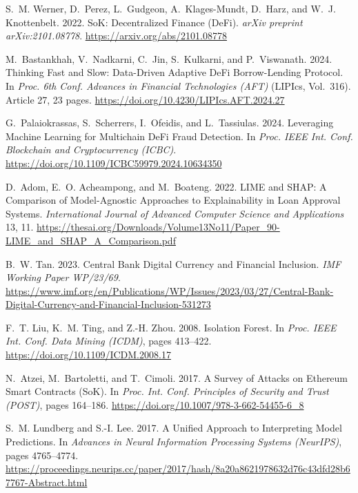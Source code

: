 \documentclass[12pt,a4paper]{report}
\begin{document}
{\small
\begin{enumerate}[label={[\arabic*]}]
\setlength{\itemsep}{4pt}
\setlength{\parsep}{0pt}
\setlength{\parskip}{0pt}
\item S.~M. Werner, D.~Perez, L.~Gudgeon, A.~Klages-Mundt, D.~Harz, and W.~J. Knottenbelt. 2022. SoK: Decentralized Finance (DeFi). \emph{arXiv preprint arXiv:2101.08778}. \url{https://arxiv.org/abs/2101.08778}

\item M.~Bastankhah, V.~Nadkarni, C.~Jin, S.~Kulkarni, and P.~Viswanath. 2024. Thinking Fast and Slow: Data-Driven Adaptive DeFi Borrow-Lending Protocol. In \emph{Proc. 6th Conf. Advances in Financial Technologies (AFT)} (LIPIcs, Vol.~316). Article 27, 23 pages. \url{https://doi.org/10.4230/LIPIcs.AFT.2024.27}

\item G.~Palaiokrassas, S.~Scherrers, I.~Ofeidis, and L.~Tassiulas. 2024. Leveraging Machine Learning for Multichain DeFi Fraud Detection. In \emph{Proc. IEEE Int. Conf. Blockchain and Cryptocurrency (ICBC)}. \url{https://doi.org/10.1109/ICBC59979.2024.10634350}

\item D.~Adom, E.~O. Acheampong, and M.~Boateng. 2022. LIME and SHAP: A Comparison of Model-Agnostic Approaches to Explainability in Loan Approval Systems. \emph{International Journal of Advanced Computer Science and Applications} 13, 11. \url{https://thesai.org/Downloads/Volume13No11/Paper_90-LIME_and_SHAP_A_Comparison.pdf}

\item B.~W. Tan. 2023. Central Bank Digital Currency and Financial Inclusion. \emph{IMF Working Paper WP/23/69}. \url{https://www.imf.org/en/Publications/WP/Issues/2023/03/27/Central-Bank-Digital-Currency-and-Financial-Inclusion-531273}

\item F.~T. Liu, K.~M. Ting, and Z.-H. Zhou. 2008. Isolation Forest. In \emph{Proc. IEEE Int. Conf. Data Mining (ICDM)}, pages 413--422. \url{https://doi.org/10.1109/ICDM.2008.17}

\item N.~Atzei, M.~Bartoletti, and T.~Cimoli. 2017. A Survey of Attacks on Ethereum Smart Contracts (SoK). In \emph{Proc. Int. Conf. Principles of Security and Trust (POST)}, pages 164--186. \url{https://doi.org/10.1007/978-3-662-54455-6_8}

\item S.~M. Lundberg and S.-I. Lee. 2017. A Unified Approach to Interpreting Model Predictions. In \emph{Advances in Neural Information Processing Systems (NeurIPS)}, pages 4765--4774. \url{https://proceedings.neurips.cc/paper/2017/hash/8a20a8621978632d76c43dfd28b67767-Abstract.html}


\end{enumerate}}
\end{document}
